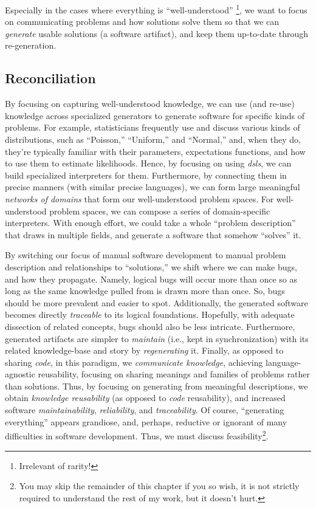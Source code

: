 Especially in the cases where everything is ``well-understood''
\cite{well-understood}\footnote{Irrelevant of rarity!}, we want to focus on
communicating problems and how solutions solve them so that we can
\textit{generate} usable solutions (a software artifact), and keep them
up-to-date through re-generation.

\subsection{Reconciliation}
\label{chap:ideology:sec:thoughts_of_generation:subsec:reconciliation}

By focusing on capturing well-understood \cite{well-understood} knowledge, we
can use (and re-use) knowledge across specialized generators to generate
software for specific kinds of problems. For example, statisticians frequently
use and discuss various kinds of distributions, such as ``Poisson,''
``Uniform,'' and ``Normal,'' and, when they do, they're typically familiar with
their parameters, expectations functions, and how to use them to estimate
likelihoods. Hence, by focusing on using \textit{\acsp{dsl}}, we can build
specialized interpreters for them. Furthermore, by connecting them in precise
manners (with similar precise languages), we can form large meaningful
\textit{networks of domains} \cite{Czarnecki2005} that form our well-understood
problem spaces. For well-understood problem spaces, we can compose a series of
domain-specific interpreters. With enough effort, we could take a whole
``problem description'' that draws in multiple fields, and generate a software
that somehow ``solves'' it.

By switching our focus of manual software development to manual problem
description and relationships to ``solutions,'' we shift where we can make bugs,
and how they propagate. Namely, logical bugs will occur more than once so as
long as the same knowledge pulled from is drawn more than once. So, bugs should
be more prevalent and easier to spot. Additionally, the generated software
becomes directly \textit{traceable} to its logical foundations. Hopefully, with
adequate dissection of related concepts, bugs should also be less intricate.
Furthermore, generated artifacts are simpler to \textit{maintain} (i.e., kept in
synchronization) with its related knowledge-base and story by
\textit{regenerating} it. Finally, as opposed to sharing \textit{code}, in this
paradigm, we \textit{communicate knowledge}, achieving language-agnostic
reusability, focusing on sharing meanings and families of problems rather than
solutions. Thus, by focusing on generating from meaningful descriptions, we
obtain \textit{knowledge reusability} (as opposed to \textit{code} reusability),
and increased software \textit{maintainability}, \textit{reliability}, and
\textit{traceability}. Of course, ``generating everything'' appears grandiose,
and, perhaps, reductive or ignorant of many difficulties in software
development. Thus, we must discuss feasibility\footnote{You may skip the
remainder of this chapter if you so wish, it is not strictly required to
understand the rest of my work, but it doesn't hurt.}.

